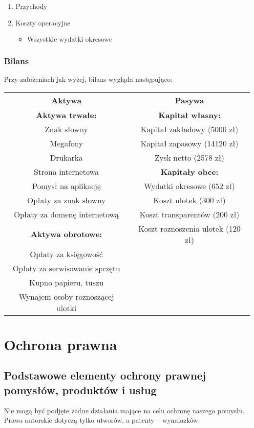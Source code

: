 \documentclass{article}
\begin{document}
\begin{enumerate}
\item Przychody

\item Koszty operacyjne
\begin{itemize}
\item Wszystkie wydatki okresowe 
\end{itemize}

\end{enumerate}

\subsubsection{Bilans}
Przy założeniach jak wyżej, bilans wygląda następująco:
\begin{table}[!ht]
\label{tableb}
\vspace{0.3cm}
\hspace{-2cm}
\centering
\begin{tabular}{|c|c|}
\hline
\textbf{Aktywa} & \textbf{Pasywa} \\
\hline
\textbf{Aktywa trwałe:} & \textbf{Kapitał własny:} \\
Znak słowny & Kapitał zakładowy (5000 zł) \\
Megafony & Kapitał zapasowy (14120 zł) \\
Drukarka	& Zysk netto (2578 zł) \\
Strona internetowa & \textbf{Kapitały obce:} \\
Pomysł na aplikację & Wydatki okresowe (652 zł) \\
Opłaty za znak słowny  & Koszt ulotek (300 zł) \\
Opłaty za domenę internetową & Koszt transparentów (200 zł) \\
\textbf{Aktywa obrotowe:} & Koszt roznoszenia ulotek (120 zł) \\
Opłaty za księgowość & \\
Opłaty za serwisowanie sprzętu & \\
Kupno papieru, tuszu & \\
Wynajem osoby roznoszącej ulotki & \\
\hline
\end{tabular}
\end{table}

\section{Ochrona prawna}
\subsection{Podstawowe elementy ochrony prawnej pomysłów, produktów i usług}
Nie mogą być podjęte żadne działania mające na celu ochronę naszego pomysłu. Prawa autorskie dotyczą tylko utworów, a patenty -- wynalazków. 
\end{document}
